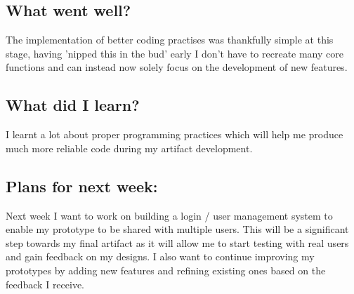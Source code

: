\subsection*{What went well?}
The implementation of better coding practises was thankfully simple at this stage, having 'nipped this in the bud' early I don't have to recreate many core functions and can instead now solely focus on the development of new features.


\subsection*{What did I learn?}
I learnt a lot about proper programming practices which will help me produce much more reliable code during my artifact development.


\subsection*{Plans for next week:}
Next week I want to work on building a login / user management system to enable my prototype to be shared with multiple users. This will be a significant step towards my final artifact as it will allow me to start testing with real users and gain feedback on my designs. I also want to continue improving my prototypes by adding new features and refining existing ones based on the feedback I receive.
